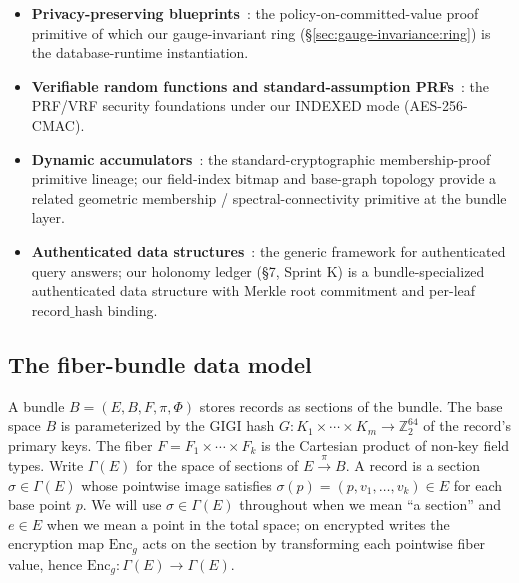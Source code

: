 \documentclass[11pt,letterpaper]{article}
\begin{document}
\begin{itemize}[nosep]
{  garman2024mercurial}: the two-decade anonymous-credential
  delegation lineage; conceptually adjacent to our pairing-based
  delegation construction (\S 6, Sprint J.2), which delivers the
  database-record-access analogue at the storage layer.
\item \textbf{Privacy-preserving
  blueprints}~\cite{kohlweiss2023blueprints}: the
  policy-on-committed-value proof primitive of which our
  gauge-invariant ring (\S\ref{sec:gauge-invariance:ring}) is the
  database-runtime instantiation.
\item \textbf{Verifiable random functions and standard-assumption
  PRFs}~\cite{lysyanskaya2002vrf, bellare2024prfs}: the PRF/VRF
  security foundations under our INDEXED mode (AES-256-CMAC).
\item \textbf{Dynamic accumulators}~\cite{camenisch2002accumulators,
  kemmoe2024accumulator}: the standard-cryptographic membership-proof
  primitive lineage; our field-index bitmap and base-graph topology
  provide a related geometric membership / spectral-connectivity
  primitive at the bundle layer.
\item \textbf{Authenticated data
  structures}~\cite{goodrich2010authdata-generic}: the generic
  framework for authenticated query answers; our holonomy ledger
  (\S 7, Sprint K) is a bundle-specialized authenticated data
  structure with Merkle root commitment and per-leaf
  $\mathrm{record\_hash}$ binding.
\end{itemize}

\subsection{The fiber-bundle data model}
\label{sec:background:bundle}

A bundle $B = (E, B, F, \pi, \Phi)$ stores records as sections of the
bundle. The base space $B$ is parameterized by the GIGI hash
$G: K_1 \times \cdots \times K_m \to \mathbb{Z}_2^{64}$ of the record's
primary keys. The fiber $F = F_1 \times \cdots \times F_k$ is the
Cartesian product of non-key field types. Write $\Gamma(E)$ for the
space of sections of $E \xrightarrow{\pi} B$. A record is a section
$\sigma \in \Gamma(E)$ whose pointwise image satisfies
$\sigma(p) = (p, v_1, \ldots, v_k) \in E$ for each base point $p$.
We will use $\sigma \in \Gamma(E)$ throughout when we mean ``a
section'' and $e \in E$ when we mean a point in the total space; on
encrypted writes the encryption map $\mathrm{Enc}_g$ acts on the
section by transforming each pointwise fiber value, hence
$\mathrm{Enc}_g: \Gamma(E) \to \Gamma(E)$.
\end{document}
